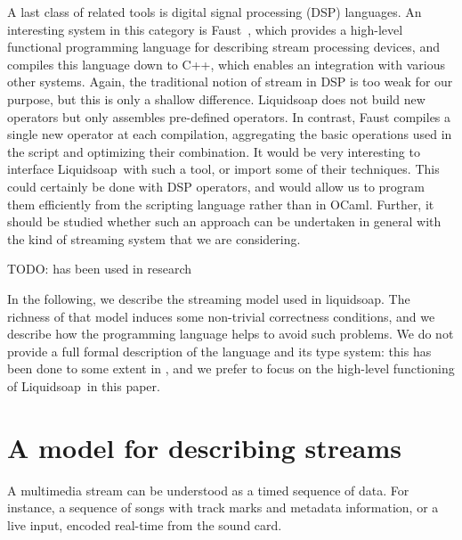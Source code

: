 \documentclass{llncs}
\newcommand{\liquidsoap}{Liquidsoap}
\newcommand{\TODO}[1]{\marginpar{#1}}
\begin{document}
A last class of related tools is digital signal processing (DSP) languages.
An interesting system in this category is Faust~\cite{faust},
which provides a high-level functional programming language for
describing stream processing devices,
and compiles this language down to C++, which enables an integration
with various other systems.
Again, the traditional notion of stream in DSP is too weak for our
purpose, but this is only a shallow difference.
Liquidsoap does not build new operators but only assembles pre-defined
operators. In contrast, Faust compiles a single new operator at each
compilation, aggregating the basic operations used in the script
and optimizing their combination.
It would be very interesting to interface \liquidsoap\ with such a tool,
or import some of their techniques. This could certainly be done with
DSP operators, and would allow us to program them efficiently from
the scripting language rather than in OCaml. Further, it should
be studied whether such an approach can be undertaken in general with
the kind of streaming system that we are considering.


TODO: has been used in research~\cite{baccigalupo2007case,baccigalupo2007sharing}

In the following, we describe the streaming model used in liquidsoap.
The richness of that model induces some non-trivial correctness conditions,
and we describe how the programming language helps to avoid such
problems.
We do not provide a full formal description of the language and its
type system: this has been done to some extent in 
\cite{baelde-mimram:webradio-lambda}, and we prefer to focus on the
high-level functioning of \liquidsoap\ in this paper.


\section{A model for describing streams}
\label{sec:model}
\TODO{transitions (complications sur le partage)}

A multimedia stream can be understood as a timed sequence of data. For instance, a sequence of songs with
track marks and metadata information, or a live input, encoded real-time from the sound card.
\end{document}
